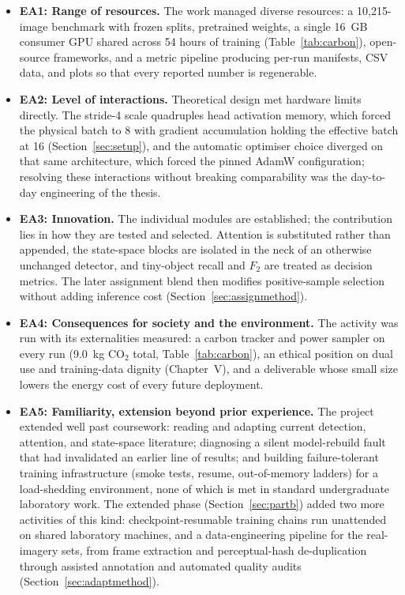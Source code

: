 \documentclass[12pt,a4paper,oneside]{report}
\begin{document}
\begin{itemize}
  \item \textbf{EA1: Range of resources.} The work managed diverse
        resources: a 10{,}215-image benchmark with frozen splits, pretrained
        weights, a single 16~GB consumer GPU shared across 54 hours of
        training (Table~\ref{tab:carbon}), open-source frameworks, and a
        metric pipeline producing per-run manifests, CSV data, and plots so
        that every reported number is regenerable.
  \item \textbf{EA2: Level of interactions.} Theoretical design met hardware
        limits directly. The stride-4 scale quadruples head activation
        memory, which forced the physical batch to 8 with gradient
        accumulation holding the effective batch at 16 (Section~\ref{sec:setup}), and
        the automatic optimiser choice diverged on that same architecture,
        which forced the pinned AdamW configuration; resolving these
        interactions without breaking comparability was the day-to-day
        engineering of the thesis.
  \item \textbf{EA3: Innovation.} The individual modules are established; the
        contribution lies in how they are tested and selected. Attention is
        substituted rather than appended, the state-space blocks are isolated
        in the neck of an otherwise unchanged detector, and tiny-object recall
        and $F_2$ are treated as decision metrics. The later assignment blend
        then modifies positive-sample selection without adding inference cost
        (Section~\ref{sec:assignmethod}).
  \item \textbf{EA4: Consequences for society and the environment.} The
        activity was run with its externalities measured: a carbon tracker
        and power sampler on every run (9.0~kg CO$_2$ total,
        Table~\ref{tab:carbon}), an ethical position on dual use and
        training-data dignity (Chapter~V), and a deliverable whose small
        size lowers the energy cost of every future deployment.
  \item \textbf{EA5: Familiarity, extension beyond prior experience.} The
        project extended well past coursework: reading and adapting current
        detection, attention, and state-space literature; diagnosing a
        silent model-rebuild fault that had invalidated an earlier line of
        results; and building failure-tolerant training infrastructure
        (smoke tests, resume, out-of-memory ladders) for a load-shedding
        environment, none of which is met in standard undergraduate
        laboratory work. The extended phase (Section~\ref{sec:partb}) added
        two more activities of this kind: checkpoint-resumable training
        chains run unattended on shared laboratory machines, and a
        data-engineering pipeline for the real-imagery sets, from frame
        extraction and perceptual-hash de-duplication through assisted
        annotation and automated quality audits
        (Section~\ref{sec:adaptmethod}).
\end{itemize}
\end{document}
